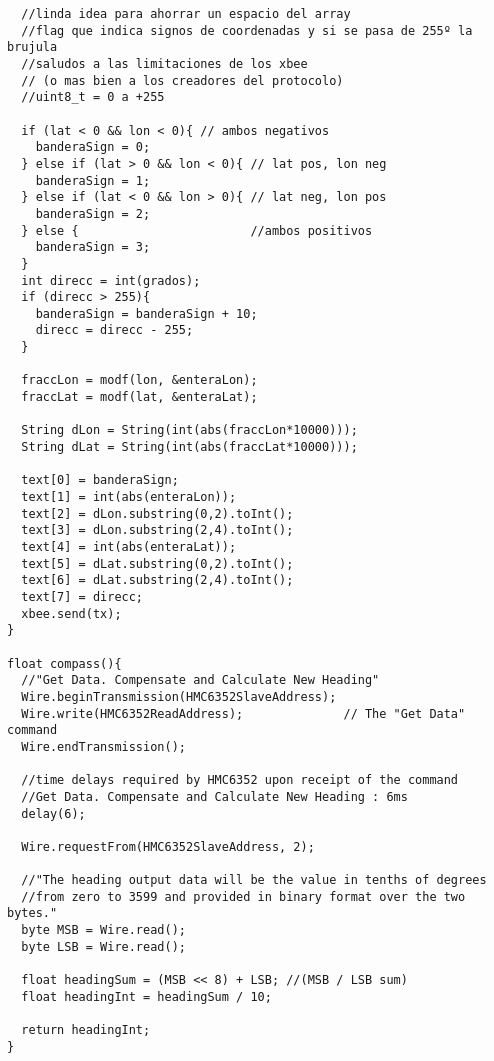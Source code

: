 \begin{verbatim}
  //linda idea para ahorrar un espacio del array
  //flag que indica signos de coordenadas y si se pasa de 255º la brujula
  //saludos a las limitaciones de los xbee
  // (o mas bien a los creadores del protocolo)
  //uint8_t = 0 a +255

  if (lat < 0 && lon < 0){ // ambos negativos
    banderaSign = 0;
  } else if (lat > 0 && lon < 0){ // lat pos, lon neg
    banderaSign = 1;
  } else if (lat < 0 && lon > 0){ // lat neg, lon pos
    banderaSign = 2;
  } else {                        //ambos positivos
    banderaSign = 3;
  }
  int direcc = int(grados);
  if (direcc > 255){
    banderaSign = banderaSign + 10;
    direcc = direcc - 255;
  }

  fraccLon = modf(lon, &enteraLon);
  fraccLat = modf(lat, &enteraLat);

  String dLon = String(int(abs(fraccLon*10000)));
  String dLat = String(int(abs(fraccLat*10000)));

  text[0] = banderaSign;
  text[1] = int(abs(enteraLon));
  text[2] = dLon.substring(0,2).toInt();
  text[3] = dLon.substring(2,4).toInt();
  text[4] = int(abs(enteraLat));
  text[5] = dLat.substring(0,2).toInt();
  text[6] = dLat.substring(2,4).toInt();
  text[7] = direcc;
  xbee.send(tx);
}

float compass(){
  //"Get Data. Compensate and Calculate New Heading"
  Wire.beginTransmission(HMC6352SlaveAddress);
  Wire.write(HMC6352ReadAddress);              // The "Get Data" command
  Wire.endTransmission();

  //time delays required by HMC6352 upon receipt of the command
  //Get Data. Compensate and Calculate New Heading : 6ms
  delay(6);

  Wire.requestFrom(HMC6352SlaveAddress, 2); 

  //"The heading output data will be the value in tenths of degrees
  //from zero to 3599 and provided in binary format over the two bytes."
  byte MSB = Wire.read();
  byte LSB = Wire.read();

  float headingSum = (MSB << 8) + LSB; //(MSB / LSB sum)
  float headingInt = headingSum / 10; 

  return headingInt;
}

\end{verbatim}
